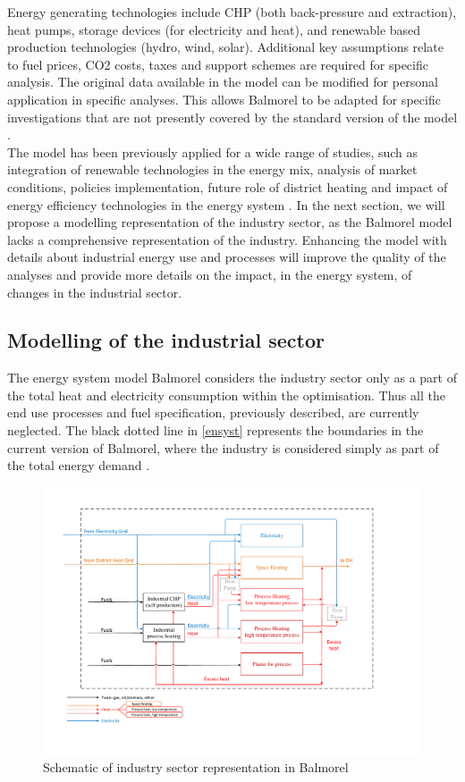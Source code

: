 \documentclass[review]{elsarticle}
\begin{document}
Energy generating technologies include CHP (both back-pressure and extraction), heat pumps, storage devices (for electricity and heat), and renewable based production technologies (hydro, wind, solar).
Additional key assumptions relate to fuel prices, CO2 costs, taxes and support schemes are required for specific analysis.
The original data available in the model can be modified for personal application in specific analyses. This allows Balmorel to be adapted for specific investigations that are not presently covered by the standard version of the model \cite{Wiese}.
\\
The model has been previously applied for a wide range of studies, such as integration of renewable technologies in the energy mix, analysis of market conditions, policies implementation, future role of district heating and impact of energy efficiency technologies in the energy system \cite{Ball2007,Jensen2008,Karlsson2008,Munster2012,Munster2010,Baldini2016a}.
In the next section, we will propose a modelling representation of the industry sector, as the Balmorel model lacks a comprehensive representation of the industry. Enhancing the model with details about industrial energy use and processes will improve the quality of the analyses and provide more details on the impact, in the energy system, of changes in the industrial sector.

\subsection{Modelling of the industrial sector}

The energy system model Balmorel considers the industry sector only as a part of the total heat and electricity consumption within the optimisation. Thus all the end use processes and fuel specification, previously described, are currently neglected. The black dotted line in \autoref{ensyst} represents the boundaries in the current version of Balmorel, where the industry is considered simply as part of the total energy demand . 

\begin{figure}[H]
\centering
\includegraphics[width=\linewidth]{Img/ind_model/IndustryEnergyFlowchart.pdf}
\caption{Schematic of industry sector representation in Balmorel}
\label{ensyst} 
\end{figure}
\end{document}
